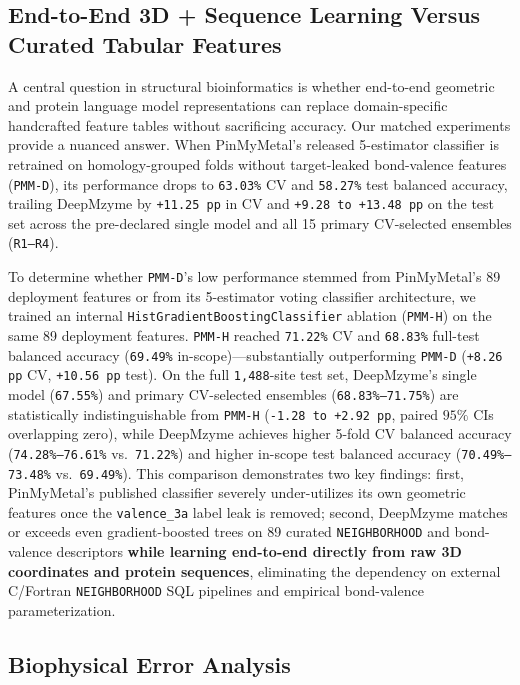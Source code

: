 \documentclass[10pt,a4paper,twocolumn]{article}
\begin{document}
\subsection{End-to-End 3D + Sequence Learning Versus Curated Tabular Features}

A central question in structural bioinformatics is whether end-to-end geometric and protein language model representations can replace domain-specific handcrafted feature tables without sacrificing accuracy. Our matched experiments provide a nuanced answer. When PinMyMetal's released 5-estimator classifier is retrained on homology-grouped folds without target-leaked bond-valence features (\texttt{PMM-D}), its performance drops to \texttt{63.03\%} CV and \texttt{58.27\%} test balanced accuracy, trailing DeepMzyme by \texttt{+11.25 pp} in CV and \texttt{+9.28 to +13.48 pp} on the test set across the pre-declared single model and all 15 primary CV-selected ensembles (\texttt{R1--R4}).

To determine whether \texttt{PMM-D}'s low performance stemmed from PinMyMetal's 89 deployment features or from its 5-estimator voting classifier architecture, we trained an internal \texttt{HistGradientBoostingClassifier} ablation (\texttt{PMM-H}) on the same 89 deployment features. \texttt{PMM-H} reached \texttt{71.22\%} CV and \texttt{68.83\%} full-test balanced accuracy (\texttt{69.49\%} in-scope)---substantially outperforming \texttt{PMM-D} (\texttt{+8.26 pp} CV, \texttt{+10.56 pp} test). On the full \texttt{1,488}-site test set, DeepMzyme's single model (\texttt{67.55\%}) and primary CV-selected ensembles (\texttt{68.83\%--71.75\%}) are statistically indistinguishable from \texttt{PMM-H} (\texttt{-1.28 to +2.92 pp}, paired $95\%$ CIs overlapping zero), while DeepMzyme achieves higher 5-fold CV balanced accuracy (\texttt{74.28\%--76.61\%} vs.\ \texttt{71.22\%}) and higher in-scope test balanced accuracy (\texttt{70.49\%--73.48\%} vs.\ \texttt{69.49\%}). This comparison demonstrates two key findings: first, PinMyMetal's published classifier severely under-utilizes its own geometric features once the \texttt{valence\_3a} label leak is removed; second, DeepMzyme matches or exceeds even gradient-boosted trees on 89 curated \texttt{NEIGHBORHOOD} and bond-valence descriptors \textbf{while learning end-to-end directly from raw 3D coordinates and protein sequences}, eliminating the dependency on external C/Fortran \texttt{NEIGHBORHOOD} SQL pipelines and empirical bond-valence parameterization.

\subsection{Biophysical Error Analysis}
\end{document}
